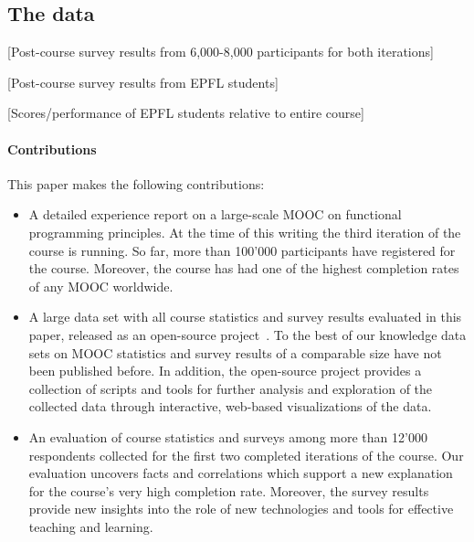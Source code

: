 \documentclass{sig-alternate}
\begin{document}
\subsection{The data}

[Post-course survey results from 6,000-8,000 participants for both iterations]

[Post-course survey results from EPFL students]

[Scores/performance of EPFL students relative to entire course]


\paragraph{Contributions} This paper makes the following contributions:

\begin{itemize}

\item A detailed experience report on a large-scale MOOC on functional programming
  principles. At the time of this writing the third iteration of the course is running. So far,
  more than 100'000 participants have registered for the course. Moreover, the course has had
  one of the highest completion rates of any MOOC worldwide.

\item A large data set with all course statistics and survey results evaluated in this paper,
  released as an open-source project~\cite{progfun-stats}. To the best of our knowledge data
  sets on MOOC statistics and survey results of a comparable size have not been published
  before. In addition, the open-source project provides a collection of scripts and tools for
  further analysis and exploration of the collected data through interactive, web-based
  visualizations of the data.

\item An evaluation of course statistics and surveys among more than 12'000 respondents
  collected for the first two completed iterations of the course. Our evaluation uncovers facts
  and correlations which support a new explanation for the course's very high completion rate.
  Moreover, the survey results provide new insights into the role of new technologies and tools
  for effective teaching and learning.

\end{itemize}
\end{document}
